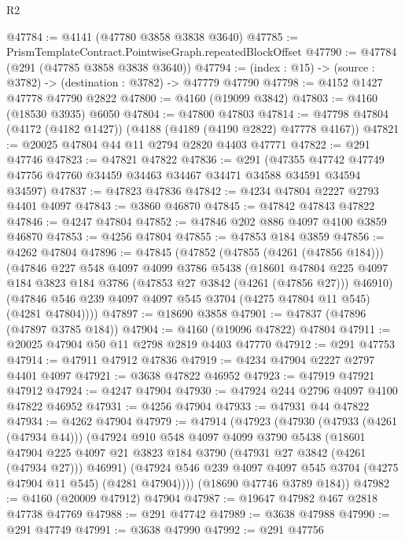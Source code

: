 \begin{lexlean}{R2}
\begin{coremodule}
@47784 := @4141 (@47780 @3858 @3838 @3640)
@47785 := PrismTemplateContract.PointwiseGraph.repeatedBlockOffset
@47790 := @47784 (@291 (@47785 @3858 @3838 @3640))
@47794 := (index : @15) -> (source : @3782) -> (destination : @3782) -> @47779 @47790
@47798 := @4152 @1427 @47778 @47790 @2822
@47800 := @4160 (@19099 @3842)
@47803 := @4160 (@18530 @3935) @6050
@47804 := @47800 @47803
@47814 := @47798 @47804 (@4172 (@4182 @1427)) (@4188 (@4189 (@4190 @2822) @47778 @4167))
@47821 := @20025 @47804 @44 @11 @2794 @2820 @4403 @47771
@47822 := @291 @47746
@47823 := @47821 @47822
@47836 := @291
    (@47355 @47742 @47749 @47756 @47760 @34459 @34463 @34467 @34471 @34588 @34591 @34594 @34597)
@47837 := @47823 @47836
@47842 := @4234 @47804 @2227 @2793 @4401 @4097
@47843 := @3860 @46870
@47845 := @47842 @47843 @47822
@47846 := @4247 @47804
@47852 := @47846 @202 @886 @4097 @4100 @3859 @46870
@47853 := @4256 @47804
@47855 := @47853 @184 @3859
@47856 := @4262 @47804
@47896 := @47845
    (@47852
      (@47855 (@4261 (@47856 @184)))
      (@47846
        @227
        @548
        @4097
        @4099
        @3786
        @5438
        (@18601
          @47804
          @225
          @4097
          @184
          @3823
          @184
          @3786
          (@47853 @27 @3842 (@4261 (@47856 @27)))
          @46910)
        (@47846 @546 @239 @4097 @4097 @545 @3704 (@4275 @47804 @11 @545) (@4281 @47804))))
@47897 := @18690 @3858
@47901 := @47837 (@47896 (@47897 @3785 @184))
@47904 := @4160 (@19096 @47822) @47804
@47911 := @20025 @47904 @50 @11 @2798 @2819 @4403 @47770
@47912 := @291 @47753
@47914 := @47911 @47912 @47836
@47919 := @4234 @47904 @2227 @2797 @4401 @4097
@47921 := @3638 @47822 @46952
@47923 := @47919 @47921 @47912
@47924 := @4247 @47904
@47930 := @47924 @244 @2796 @4097 @4100 @47822 @46952
@47931 := @4256 @47904
@47933 := @47931 @44 @47822
@47934 := @4262 @47904
@47979 := @47914
    (@47923
      (@47930
        (@47933 (@4261 (@47934 @44)))
        (@47924
          @910
          @548
          @4097
          @4099
          @3790
          @5438
          (@18601
            @47904
            @225
            @4097
            @21
            @3823
            @184
            @3790
            (@47931 @27 @3842 (@4261 (@47934 @27)))
            @46991)
          (@47924 @546 @239 @4097 @4097 @545 @3704 (@4275 @47904 @11 @545) (@4281 @47904))))
      (@18690 @47746 @3789 @184))
@47982 := @4160 (@20009 @47912) @47904
@47987 := @19647 @47982 @467 @2818 @47738 @47769
@47988 := @291 @47742
@47989 := @3638 @47988
@47990 := @291 @47749
@47991 := @3638 @47990
@47992 := @291 @47756

\end{coremodule}
\end{lexlean}
